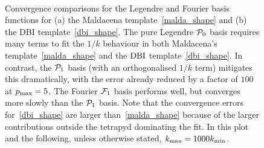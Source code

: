 \begin{figure}[!pth]
\centering     %
\\
\caption{
    Convergence comparisons for the Legendre and Fourier basis functions for (a) the Maldacena 
    template~\eqref{malda_shape} and (b) the DBI template~\eqref{dbi_shape}.
    The pure Legendre $\mathcal{P}_0$ basis requires many terms to fit the $1/k$ behaviour
    in both Maldacena's template~\eqref{malda_shape} and the $\text{DBI}$ template~\eqref{dbi_shape}.
    In contrast, the $\mathcal{P}_1$ basis (with an orthogonalised $1/k$ term) mitigates this dramatically, with the 
    error already reduced by a factor of $100$ at $p_\text{max}=5$.
    The Fourier $\mathcal{F}_1$ basis performs well, but converges more slowly than the $\mathcal{P}_1$ basis.
    Note that the convergence errors for~\eqref{dbi_shape} are larger than~\eqref{malda_shape} because of the larger contributions outside the tetrapyd dominating the fit.
    In this plot and the following, unless otherwise stated, ${k_\text{max}}=1000{k_\text{min}}$.
}\label{fig:recon_malda_dbi}
\end{figure}


